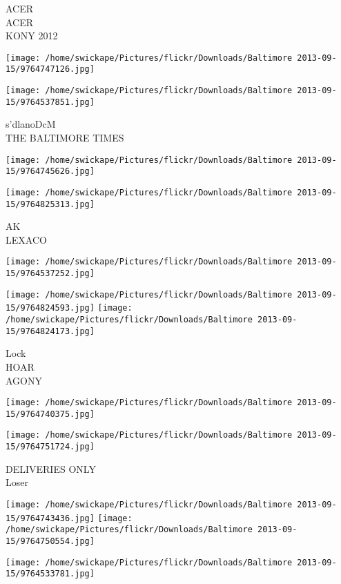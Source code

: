 \documentclass[10pt,letterpaper]{article}
\begin{document}
ACER\\
ACER\\
KONY 2012
\pagebreak

\texttt{[image: /home/swickape/Pictures/flickr/Downloads/Baltimore 2013-09-15/9764747126.jpg]}

\vspace{0.25in}
\texttt{[image: /home/swickape/Pictures/flickr/Downloads/Baltimore 2013-09-15/9764537851.jpg]}

s'dlanoDcM\\
THE BALTIMORE TIMES
\pagebreak

\texttt{[image: /home/swickape/Pictures/flickr/Downloads/Baltimore 2013-09-15/9764745626.jpg]}

\vspace{0.25in}
\texttt{[image: /home/swickape/Pictures/flickr/Downloads/Baltimore 2013-09-15/9764825313.jpg]}

AK\\
LEXACO
\pagebreak

\texttt{[image: /home/swickape/Pictures/flickr/Downloads/Baltimore 2013-09-15/9764537252.jpg]}

\vspace{0.25in}
\texttt{[image: /home/swickape/Pictures/flickr/Downloads/Baltimore 2013-09-15/9764824593.jpg]}
\texttt{[image: /home/swickape/Pictures/flickr/Downloads/Baltimore 2013-09-15/9764824173.jpg]}

Lock\\
HOAR\\
AGONY
\pagebreak

\texttt{[image: /home/swickape/Pictures/flickr/Downloads/Baltimore 2013-09-15/9764740375.jpg]}

\vspace{0.25in}
\texttt{[image: /home/swickape/Pictures/flickr/Downloads/Baltimore 2013-09-15/9764751724.jpg]}

DELIVERIES ONLY\\
Loser
\pagebreak

\texttt{[image: /home/swickape/Pictures/flickr/Downloads/Baltimore 2013-09-15/9764743436.jpg]}
\texttt{[image: /home/swickape/Pictures/flickr/Downloads/Baltimore 2013-09-15/9764750554.jpg]}

\texttt{[image: /home/swickape/Pictures/flickr/Downloads/Baltimore 2013-09-15/9764533781.jpg]}
\end{document}
